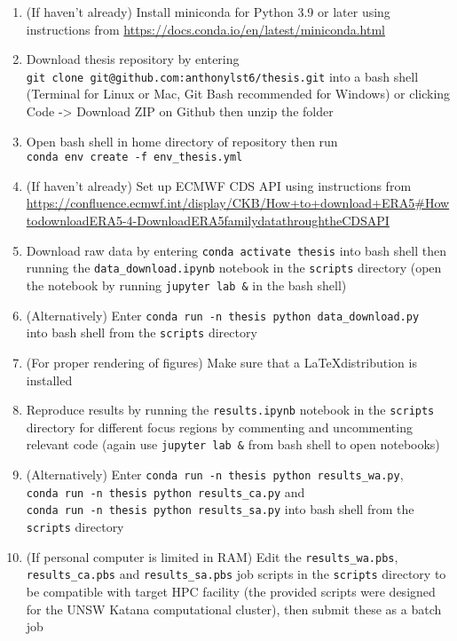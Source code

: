 \begin{enumerate}
	\item (If haven't already) Install miniconda for Python 3.9 or later using instructions from \url{https://docs.conda.io/en/latest/miniconda.html}
	\item Download thesis repository by entering \\ \verb+git clone git@github.com:anthonylst6/thesis.git+ into a bash shell (Terminal for Linux or Mac, Git Bash recommended for Windows) or clicking Code -> Download ZIP on Github then unzip the folder
	\item Open bash shell in home directory of repository then run \\ \verb+conda env create -f env_thesis.yml+
	\item (If haven't already) Set up \ac{ECMWF} \ac{CDS} API using instructions from \url{https://confluence.ecmwf.int/display/CKB/How+to+download+ERA5#HowtodownloadERA5-4-DownloadERA5familydatathroughtheCDSAPI}
	\item Download raw data by entering \verb+conda activate thesis+ into bash shell then running the \verb+data_download.ipynb+ notebook in the \verb+scripts+ directory (open the notebook by running \verb+jupyter lab &+ in the bash shell)
	\item (Alternatively) Enter \verb+conda run -n thesis python data_download.py+ \\ into bash shell from the \verb+scripts+ directory
	\item (For proper rendering of figures) Make sure that a \LaTeX distribution is installed
	\item Reproduce results by running the \verb+results.ipynb+ notebook in the \verb+scripts+ directory for different focus regions by commenting and uncommenting relevant code (again use \verb+jupyter lab &+ from bash shell to open notebooks)
	\item (Alternatively) Enter \verb+conda run -n thesis python results_wa.py+, \\ \verb+conda run -n thesis python results_ca.py+ and \\ \verb+conda run -n thesis python results_sa.py+ into bash shell from the \\ \verb+scripts+ directory
	\item (If personal computer is limited in RAM) Edit the \verb+results_wa.pbs+, \\ \verb+results_ca.pbs+ and \verb+results_sa.pbs+ job scripts in the \verb+scripts+ directory to be compatible with target HPC facility (the provided scripts were designed for the UNSW Katana computational cluster), then submit these as a batch job
\end{enumerate}

